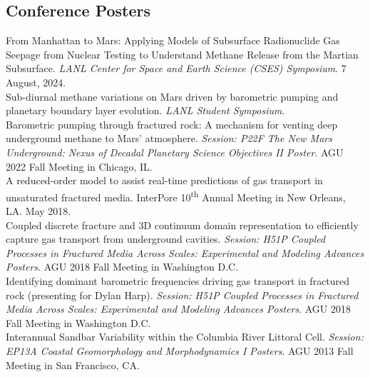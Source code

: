 \documentclass[11pt, letterpaper]{article}
\newcommand{\years}[1]{\marginnote{\scriptsize #1}}
\begin{document}
\subsection*{Conference Posters}
%
\years{2024}
From Manhattan to Mars: Applying Models of Subsurface
Radionuclide Gas Seepage from Nuclear Testing to Understand Methane Release
from the Martian Subsurface. \textit{LANL Center for Space and Earth Science (CSES)
Symposium}. 7 August, 2024.\\ 
%
\years{2023}
Sub-diurnal methane variations on Mars driven by barometric pumping and
planetary boundary layer evolution. \textit{LANL Student Symposium}.\\
%
\years{2022}
Barometric pumping through fractured rock: A
mechanism for venting deep underground methane to Mars' atmosphere.
\textit{Session: P22F The New Mars Underground: Nexus of Decadal Planetary
Science Objectives II Poster}. AGU 2022 Fall Meeting in Chicago, IL.
\AGUFallMeetingAbstraOOOOBarometricPumpingThr\\ 
%
\years{2018}
A reduced-order model to assist real-time predictions of gas transport in
unsaturated fractured media. InterPore 10\textsuperscript{th} Annual Meeting in
New Orleans, LA. May 2018.\\
%
\years{2018}
Coupled discrete fracture and 3D continuum domain representation
to efficiently capture gas transport from underground cavities.
\textit{Session: H51P Coupled Processes in Fractured Media Across Scales:
Experimental and Modeling Advances Posters}. AGU 2018 Fall Meeting in
Washington D.C. \\
%
\years{2018}
Identifying dominant barometric
frequencies driving gas transport in fractured rock (presenting for Dylan
Harp). \textit{Session: H51P Coupled Processes in Fractured Media Across
Scales: Experimental and Modeling Advances Posters}. AGU 2018 Fall Meeting in
Washington D.C. 
\AGUFallMeetingOOOOIdentifyingdominantb\\
%
\years{2013}
Interannual Sandbar Variability within the Columbia River Littoral Cell.
\textit{Session: EP13A Coastal Geomorphology and Morphodynamics I Posters}.
AGU 2013 Fall Meeting in San Francisco, CA.
\end{document}

